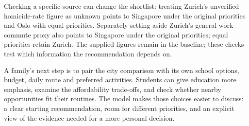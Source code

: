 Checking a specific source can change the shortlist: treating Zurich's unverified homicide-rate figure as unknown points to Singapore under the original priorities and Oslo with equal priorities. Separately setting aside Zurich's general work-commute proxy also points to Singapore under the original priorities; equal priorities retain Zurich. The supplied figures remain in the baseline; these checks test which information the recommendation depends on.

A family's next step is to pair the city comparison with its own school options, budget, daily route and preferred activities. Students can give education more emphasis, examine the affordability trade-offs, and check whether nearby opportunities fit their routines. The model makes those choices easier to discuss: a clear starting recommendation, room for different priorities, and an explicit view of the evidence needed for a more personal decision.
